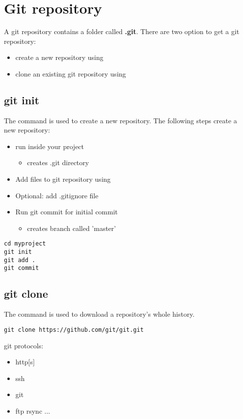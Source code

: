 \section{Git repository}
\begin{frame}[fragile]
    \slidetitle
    A git repository contains a folder called {\bf .git}. There are two option to get a git repository:
\begin{itemize}
\item create a new repository using 
\item clone an existing git repository using 
\end{itemize}
\end{frame}

\subsection{git init}
\begin{frame}[fragile]
  \subslidetitle
  The command  is used to create a new repository.
  The following steps create a new repository:
  \begin{itemize}
  \item run  inside your project
    \begin{itemize}
    \item creates .git directory
    \end{itemize}
  \item Add files to git repository using 
  \item Optional: add .gitignore file
  \item Run {git commit} for initial commit
    \begin{itemize}
    \item creates branch called 'master'
    \end{itemize}
  \end{itemize}

  \begin{lstlisting}
cd myproject
git init
git add .
git commit
  \end{lstlisting}
\end{frame}

\subsection{git clone}
\begin{frame}[fragile]
  \subslidetitle
  The command  is used to download a repository's whole history.
  \begin{lstlisting}
git clone https://github.com/git/git.git
  \end{lstlisting}

git protocols:
\begin{itemize}
\item http[s]
\item ssh
\item git
\item ftp rsync ...
\end{itemize}
\end{frame}

